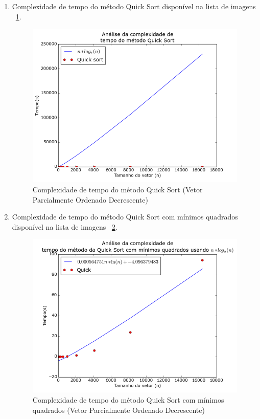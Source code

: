 \documentclass[12pt,a4paper,twoside]{report}
\begin{document}
			\begin{enumerate}
										


											\item Complexidade de tempo do método Quick Sort disponível na lista de imagens ~\ref{fig:QuickPlot2POD}.
											\begin{figure}[!h]
												\centering
												\includegraphics[scale=0.6]{../imagens/Quick/Quick_plot_2_parcialmente_ordenado_decrescente.png}
												\caption{Complexidade de tempo do método Quick Sort (Vetor Parcialmente Ordenado Decrescente) \label{fig:QuickPlot2POD}}
											\end{figure}


											\item Complexidade de tempo do método Quick Sort com mínimos quadrados disponível na lista de imagens  ~\ref{fig:QuickPlot3POD}.
											\begin{figure}[!h]
												\centering
												\includegraphics[scale=0.6]{../imagens/Quick/Quick_plot_3_parcialmente_ordenado_decrescente.png}
												\caption{Complexidade de tempo do método Quick Sort com mínimos quadrados (Vetor Parcialmente Ordenado Decrescente) \label{fig:QuickPlot3POD}}
											\end{figure}

										\end{enumerate}
\end{document}
